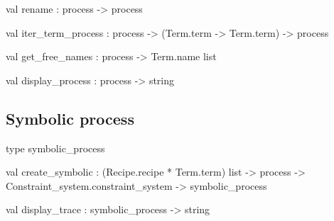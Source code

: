 \label{val:Process.rename}\begin{ocamldoccode}
val rename : process -> process
\end{ocamldoccode}




\label{val:Process.iter-underscoreterm-underscoreprocess}\begin{ocamldoccode}
val iter_term_process : process -> (Term.term -> Term.term) -> process
\end{ocamldoccode}




\label{val:Process.get-underscorefree-underscorenames}\begin{ocamldoccode}
val get_free_names : process -> Term.name list
\end{ocamldoccode}




\label{val:Process.display-underscoreprocess}\begin{ocamldoccode}
val display_process : process -> string
\end{ocamldoccode}




\subsection{Symbolic process}




\label{type:Process.symbolic-underscoreprocess}\begin{ocamldoccode}
type symbolic_process 
\end{ocamldoccode}




\label{val:Process.create-underscoresymbolic}\begin{ocamldoccode}
val create_symbolic :
  (Recipe.recipe * Term.term) list ->
  process ->
  Constraint_system.constraint_system -> symbolic_process
\end{ocamldoccode}




\label{val:Process.display-underscoretrace}\begin{ocamldoccode}
val display_trace : symbolic_process -> string
\end{ocamldoccode}




